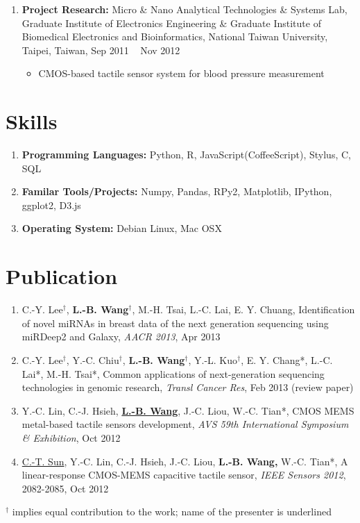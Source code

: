 \documentclass[11pt, a4paper]{scrartcl}
\begin{document}
\begin{enumerate}
    \item \textbf{Project Research:} Micro \& Nano Analytical Technologies \& Systems Lab, Graduate Institute of Electronics Engineering \& Graduate Institute of Biomedical Electronics and Bioinformatics, National Taiwan University, Taipei, Taiwan, Sep 2011 \textendash~ Nov 2012
        \begin{itemize}
            \item CMOS-based tactile sensor system for blood pressure measurement
        \end{itemize}

\end{enumerate}

\section*{Skills}
\begin{enumerate}
    \item \textbf{Programming Languages:} Python, R, JavaScript(CoffeeScript), Stylus, C, SQL
    \item \textbf{Familar Tools/Projects:} Numpy, Pandas, RPy2, Matplotlib, IPython, ggplot2, D3.js
    \item \textbf{Operating System:} Debian Linux, Mac OSX
\end{enumerate}

\section*{Publication}
\begin{enumerate}
    \item C.-Y. Lee$^\dagger$, \textbf{L.-B. Wang}$^\dagger$, M.-H. Tsai, L.-C. Lai, E. Y. Chuang, Identification of novel miRNAs in breast data of the next generation sequencing using miRDeep2 and Galaxy, \textit{AACR 2013}, Apr 2013
    \item C.-Y. Lee$^\dagger$, Y.-C. Chiu$^\dagger$, \textbf{L.-B. Wang}$^\dagger$, Y.-L. Kuo$^\dagger$, E. Y. Chang*, L.-C. Lai*, M.-H. Tsai*, Common applications of next-generation sequencing technologies in genomic research, \textit{Transl Cancer Res}, Feb 2013 (review paper)
    \item Y.-C. Lin, C.-J. Hsieh, \textbf{\uline{L.-B. Wang}}, J.-C. Liou, W.-C. Tian*, CMOS MEMS metal-based tactile sensors development, \textit{AVS 59th International Symposium \& Exhibition}, Oct 2012
    \item \uline{C.-T. Sun}, Y.-C. Lin, C.-J. Hsieh, J.-C. Liou, \textbf{L.-B. Wang,} W.-C. Tian*, A linear-response CMOS-MEMS capacitive tactile sensor, \textit{IEEE Sensors 2012}, 2082-2085, Oct 2012
\end{enumerate}
$^\dagger$ implies equal contribution to the work; name of the presenter is underlined
\end{document}
